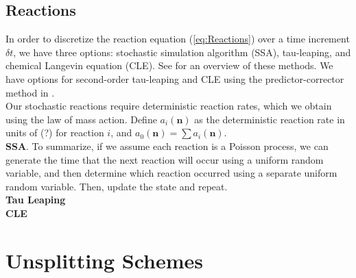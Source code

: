 \documentclass[final]{siamltex}
\newcommand{\nb}{\mathbf{n}}
\begin{document}
\subsection{Reactions}
In order to discretize the reaction equation (\ref{eq:Reactions}) over a time
increment $\delta t$, we have three options: stochastic
simulation algorithm (SSA), tau-leaping, and chemical Langevin equation (CLE).
See \cite{Gillespie2007} for an overview of these methods.  We have options
for second-order tau-leaping and CLE using the predictor-corrector
method in \cite{AndersonMattingly2011}.\\

Our stochastic reactions require deterministic reaction rates, which we obtain
using the law of mass action.  Define $a_i(\nb)$ as the deterministic reaction
rate in units of (?) for reaction $i$, and $a_0(\nb) = \sum a_i(\nb)$.\\

{\bf SSA}.  To summarize, if we assume each reaction is a Poisson process, we
can generate the time that the next reaction will occur using a uniform random
variable, and then determine which reaction occurred using a separate 
uniform random variable.  Then, update the state and repeat.\\

{\bf Tau Leaping}\\

{\bf CLE}

\section{Unsplitting Schemes}


\newcommand{\Pc}{\mathcal{P}}           %
\newcommand{\Nc}{\mathcal{N}}           %
\newcommand{\Rfrak}{\mathfrak{R}}       %
\newcommand{\nablab}{\bm{\nabla}}       %

\newcommand{\dt}{{\Delta t}}            %
\newcommand{\dthalf}{{\frac{\dt}{2}}}   %
\newcommand{\dV}{{\Delta V}}            %

\newcommand{\Ns}{{N_\mathrm{s}}}        %
\newcommand{\Nr}{{N_\mathrm{r}}}        %
\newcommand{\Ds}{{D_s}}                 %
\newcommand{\ns}{n_s}                   %
\newcommand{\ar}{a_r}                   %
\newcommand{\tar}{{\ta_r}}              %
\newcommand{\nusr}{{\nu_{s r}}}         %
\newcommand{\tn}{\tilde{n}}             %
\newcommand{\ta}{\tilde{a}}             %
\newcommand{\pone}{{(1)}}               %
\newcommand{\ptwo}{{(2)}}               %
\end{document}
